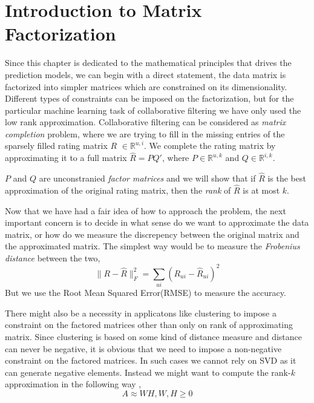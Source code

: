 \section{Introduction to Matrix Factorization}
Since this chapter is dedicated to the mathematical principles that drives the
prediction models, we can begin with a direct statement, the data matrix is
factorized into simpler matrices which are constrained on its dimensionality.
Different types of constraints can be imposed on the factorization, but for the
particular machine learning task of collaborative filtering we have only used
the low rank approximation. Collaborative filtering can be considered as
\emph{matrix completion} problem, where we are trying to fill in the missing
entries of the sparsely filled rating matrix $R$ $\in\mathbb{R}^{u,i}$. We
complete the rating matrix by approximating it to a full matrix $\hat{R}=PQ'$,
where $P \in\mathbb{R}^{u,k}$ and $Q \in\mathbb{R}^{i,k}$. 

$P$ and $Q$ are unconstranied \emph{factor matrices} and we will show that if
$\hat{R}$ is the best approximation of the original rating matrix, then the
\emph{rank} of $\hat{R}$ is at most $k$. 

Now that we have had a fair idea of how to approach the problem, the next
important concern is to decide in what sense do we want to approximate the data
matrix, or how do we measure the discrepency between the original matrix and the
approximated matrix. The simplest way would be to measure the \emph{Frobenius
distance} between the two,
\[
 \|{R-\hat{R}}\|_{F}^2 = \sum_{ui}^{}(R_{ui}-\hat{R}_{ui})^2
\]
But we use the Root Mean Squared Error(RMSE) to measure the accuracy. 

There might also be a necessity in applicatons like clustering to impose a
constraint on the factored matrices other than only on rank of approximating
matrix. Since clustering is based on some kind of distance measure and distance
can never be negative, it is obvious that we need to impose a non-negative
constraint on the factored matrices. In such cases we cannot rely on SVD as it
can generate negative elements. Instead we might want to compute the rank-$k$
approximation in the following way \cite{eld-mm:07}, \\
\[
  A\approx WH,		W,H\geq0
\] \\

